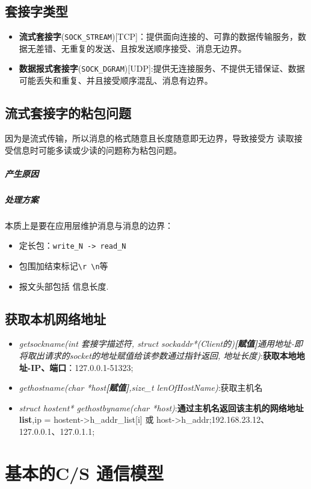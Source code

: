 \documentclass[UTF8,a4paper,8pt]{ctexbook}
\begin{document}
		\subsection{套接字类型}
			\begin{itemize}
				\item \textbf{流式套接字}(\verb|SOCK_STREAM|)[TCP]：提供面向连接的、可靠的数据传输服务，数据无差错、无重复的发送、且按发送顺序接受、消息无边界。
				\item \textbf{数据报式套接字}(\verb|SOCK_DGRAM|)[UDP]:提供无连接服务、不提供无错保证、数据可能丢失和重复、并且接受顺序混乱、消息有边界。
			\end{itemize}	
			
		\subsection{流式套接字的粘包问题}
			因为是流式传输，所以消息的格式随意且长度随意即无边界，导致接受方 读取接受信息时可能多读或少读的问题称为粘包问题。
			\subparagraph{产生原因}
				
			\subparagraph{处理方案}
				本质上是要在应用层维护消息与消息的边界：
				
				\begin{itemize}
					\item 定长包：\verb|write_N -> read_N|
					\item 包围加结束标记\verb|\r \n|等
					\item 报文头部包括 信息长度.
				\end{itemize}
		
		\subsection{获取本机网络地址}
			\begin{itemize}
				\item \textit{getsockname(int 套接字描述符, struct sockaddr*(Client的)\textbf{[赋值]}通用地址-即将取出请求的socket的地址赋值给该参数通过指针返回, 地址长度)}:\textbf{获取本地地址-IP、端口}：127.0.0.1-51323;
				\item \textit{gethostname(char *host\textbf{[赋值]},size\_t lenOfHostName)}:获取主机名
				\item \textit{struct hostent* gethostbyname(char *host)}:\textbf{通过主机名返回该主机的网络地址list},ip = hostent->h\_addr\_list[i] 或 host->h\_addr;192.168.23.12、127.0.0.1、127.0.1.1;
			\end{itemize}
			
	\section{基本的C/S 通信模型}
\end{document}
